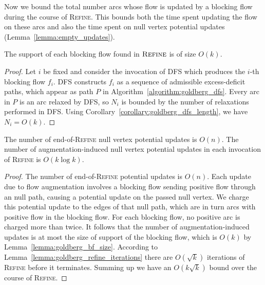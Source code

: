 \documentclass[a4paper,UKenglish]{socg-lipics-v2018}
\makeatletter
\def\note#1{\textcolor{red}{{#1}}}
\theoremstyle{plain}
\numberwithin{figure}{section}
\def\n@te#1{\textsf{\boldmath \textbf{$\langle\!\langle$#1$\rangle\!\rangle$}}\leavevmode}
\def\note#1{\textcolor{red}{\n@te{#1}}}
\makeatother
\begin{document}
Now we bound the total number arcs whose flow is updated by a blocking flow during the course of \textsc{Refine}.
This bounds both the time spent updating the flow on these arcs and also the time spent on null vertex potential updates
(Lemma~\ref{lemma:empty_updates}).

\begin{lemmarep}
\label{lemma:goldberg_bf_size}
The support of each blocking flow %
found in $\textsc{Refine}$ is of size $O(k)$.
\end{lemmarep}

\begin{proof}
Let $i$ be fixed and consider the invocation of \textsc{DFS} which produces the
$i$-th blocking flow $f_i$.
\textsc{DFS} constructs $f_i$ as a sequence of admissible excess-deficit paths,
which appear as path $P$ in Algorithm~\ref{algorithm:goldberg_dfs}.
Every arc in $P$ is an arc relaxed by \textsc{DFS}, so $N_i$ is bounded by the
number of relaxations performed in \textsc{DFS}.
Using Corollary~\ref{corollary:goldberg_dfs_length}, we have $N_i = O(k)$.
\end{proof}


\begin{lemmarep}
\label{lemma:empty_updates}
The number of end-of-\textsc{Refine} null vertex potential updates is $O(n)$.
The number of augmentation-induced null vertex potential updates in each
invocation of \textsc{Refine} is $O(k\log k)$.
\end{lemmarep}

\begin{proof}
The number of end-of-\textsc{Refine} potential updates is $O(n)$.
Each update due to flow augmentation involves a blocking flow sending positive
flow through an null path, causing a potential update on the passed
null vertex.
We charge this potential update to the edges of that null path, which are in
turn arcs with positive flow in the blocking flow.
For each blocking flow, no positive arc is charged more than twice.
It follows that the number of augmentation-induced updates is at most the size of support of the blocking flow, which is $O(k)$
by Lemma~\ref{lemma:goldberg_bf_size}.
According to Lemma~\ref{lemma:goldberg_refine_iterations} there are $O(\sqrt{k})$ iterations of \textsc{Refine} before it terminates.
Summing up we have an $O(k\sqrt{k})$ bound over the course of \textsc{Refine}.
\end{proof}
\end{document}
